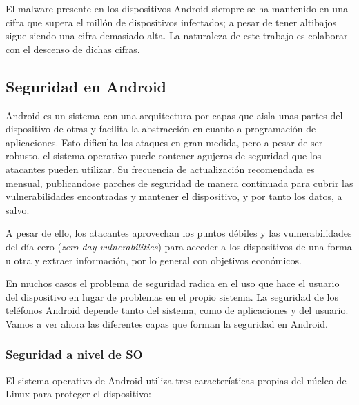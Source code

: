 El malware presente en los dispositivos Android siempre se ha mantenido en una cifra que supera el millón de dispositivos infectados; a pesar de tener altibajos sigue siendo una cifra demasiado alta. La naturaleza de este trabajo es colaborar con el descenso de dichas cifras.

\subsection{Seguridad en Android}

Android es un sistema con una arquitectura por capas que aisla unas partes del dispositivo de otras y facilita la abstracción en cuanto a programación de aplicaciones. Esto dificulta los ataques en gran medida, pero a pesar de ser robusto, el sistema operativo puede contener agujeros de seguridad que los atacantes pueden utilizar. Su frecuencia de actualización recomendada es mensual, publicandose parches de seguridad de manera continuada para cubrir las vulnerabilidades encontradas y mantener el dispositivo, y por tanto los datos, a salvo.

A pesar de ello, los atacantes aprovechan los puntos débiles y las vulnerabilidades del día cero (\textit{zero-day vulnerabilities}) para acceder a los dispositivos de una forma u otra y extraer información, por lo general con objetivos económicos.

En muchos casos el problema de seguridad radica en el uso que hace el usuario del dispositivo en lugar de problemas en el propio sistema. La seguridad de los teléfonos Android depende tanto del sistema, como de aplicaciones y del usuario. Vamos a ver ahora las diferentes capas que forman la seguridad en Android\hypersetup{citecolor=red}\cite{seclayers}.

\subsubsection{Seguridad a nivel de SO}

El sistema operativo de Android utiliza tres características propias del núcleo de Linux para proteger el dispositivo:

